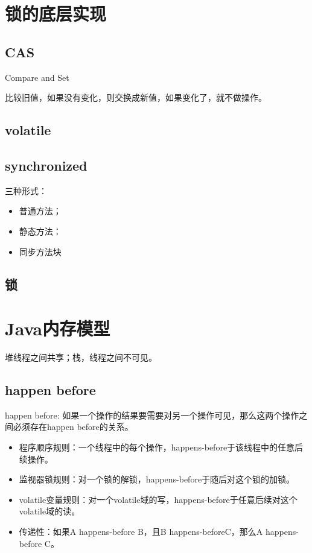 \begin{Java}




\end{Java}

\section{锁的底层实现}

\subsection{CAS}

Compare and Set

比较旧值，如果没有变化，则交换成新值，如果变化了，就不做操作。

\subsection{volatile}



\subsection{synchronized}

三种形式：
\begin{itemize}
\item 普通方法；
\item 静态方法：
\item 同步方法块
\end{itemize}

\subsection{锁}

\section{Java内存模型}

堆线程之间共享；栈，线程之间不可见。

\subsection{happen before}
happen before: 如果一个操作的结果要需要对另一个操作可见，那么这两个操作之间必须存在happen before的关系。

\begin{itemize}
\item 程序顺序规则：一个线程中的每个操作，happens-before于该线程中的任意后续操作。
\item 监视器锁规则：对一个锁的解锁，happens-before于随后对这个锁的加锁。
\item volatile变量规则：对一个volatile域的写，happens-before于任意后续对这个volatile域的读。
\item 传递性：如果A happens-before B，且B happens-beforeC，那么A happens-before C。
\end{itemize}

